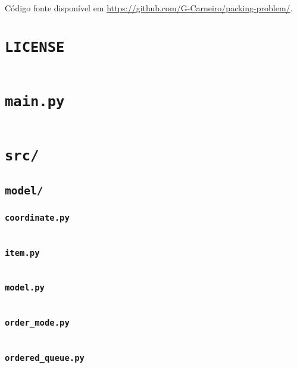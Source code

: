 Código fonte disponível em \url{https://github.com/G-Carneiro/packing-problem/}.


\section{\texttt{LICENSE}}\label{sec:license}
\inputminted{text}{LICENSE}


\section{\texttt{main.py}}\label{sec:main.py}
\inputminted{py}{main.py}


\section{\texttt{src/}}\label{sec:src/}

\subsection{\texttt{model/}}\label{subsec:model/}

\subsubsection{\texttt{coordinate.py}}\label{subsubsec:coordinate.py}
\inputminted{py}{src/model/coordinate.py}

\subsubsection{\texttt{item.py}}\label{subsubsec:item.py}
\inputminted{py}{src/model/item.py}

\subsubsection{\texttt{model.py}}\label{subsubsec:model.py}
\inputminted{py}{src/model/model.py}

\subsubsection{\texttt{order\_mode.py}}\label{subsubsec:order_mode.py}
\inputminted{py}{src/model/order_mode.py}

\subsubsection{\texttt{ordered\_queue.py}}\label{subsubsec:ordered_queue.py}
\inputminted{py}{src/model/ordered_queue.py}

